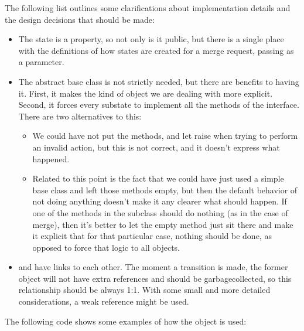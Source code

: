 \documentclass[a4paper,10pt,english]{sphinxmanual}
\begin{document}
The following list outlines some clarifications about implementation details and the design
decisions that should be made:
\begin{itemize}
\item {} 
The state is a property, so not only is it public, but there is a single place with the definitions of how states are created for a merge request, passing  as a parameter.

\item {} 
The abstract base class is not strictly needed, but there are benefits to having it. First, it makes the kind of object we are dealing with more explicit. Second, it forces every substate to implement all the methods of the interface. There are two alternatives to this:
\begin{itemize}
\item {} 
We could have not put the methods, and let  raise when trying to perform an invalid action, but this is not correct, and it doesn’t express what happened.

\item {} 
Related to this point is the fact that we could have just used a simple base class and left those methods empty, but then the default behavior of not doing anything doesn’t make it any clearer what should happen. If one of the methods in the subclass should do nothing (as in the case of merge), then it’s better to let the empty method just sit there and make it explicit that for that particular case, nothing should be done, as opposed to force that logic to all objects.

\end{itemize}

\item {} 
 and  have links to each other. The moment a transition is made, the former object will not have extra references and should be garbage\sphinxhyphen{}collected, so this relationship should be always 1:1. With some small and more detailed considerations, a weak reference might be used.

\end{itemize}

The following code shows some examples of how the object is used:
\end{document}
